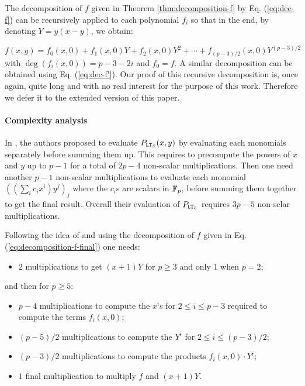 The decomposition of $f$ given in Theorem \ref{thm:decomposition-f} by Eq. (\ref{eq:dec-f}) can be recursively applied to each polynomial $f_i$ so that in the end, by denoting $Y=y(x-y)$, we obtain:

\begin{equation}
  \label{eq:decomposition-f-final}
  f(x,y) = f_0(x,0) + f_1(x,0)Y + f_2(x,0)Y^2 + \cdots + f_{(p-3)/2}(x,0)Y^{(p-3)/2}
\end{equation}
with $\deg (f_{i}(x,0)) = p-3 - 2i$ and $f_0 = f$. A similar decomposition can be obtained using Eq. (\ref{eq:dec-f'}). Our proof of this recursive decomposition is, once again, quite long and with no real interest for the purpose of this work. Therefore we defer it to the extended version of this paper.\newline

\paragraph{Complexity analysis}
In \cite{TLWRK20}, the authors proposed to evaluate $P_{\mathtt{LT}_S}(x,y)$ by evaluating each monomials separately before summing them up. This requires to precompute the powers of $x$ and $y$ up to $p-1$ for a total of $2p-4$ non-scalar multiplications. Then one need another $p-1$ non-scalar multiplications to evaluate each monomial $((\sum_i c_i x^i)y^j)_{j}$ where the $c_i$s are scalars in $\mathbb{F}_p$, before summing them together to get the final result. Overall their evaluation of $P_{\mathtt{LT}_{\mathcal{S}}}$ requires $3p-5$ non-sclar multiplications. \newline

Following the idea of \cite{TLWRK20} and using the decomposition of $f$ given in Eq. (\ref{eq:decomposition-f-final}) one needs:
\begin{itemize}
\item $2$ multiplications to get $(x+1)Y$ for $p\geq 3$ and only $1$ when $p=2$;
\end{itemize}
and then for $p\geq 5$:
\begin{itemize}
\item $p-4$ multiplications to compute the $x^i$s for $2\leq i \leq p-3$ required to compute the terms $f_i(x,0)$;
\item $(p-5)/2$ multiplications to compute the $Y^i$ for $2\leq i \leq (p-3)/2$;
\item $(p-3)/2$ multiplications to compute the products $f_i(x,0)\cdot Y^i$;
\item $1$ final multiplication to multiply $f$ and $(x+1)Y$.
\end{itemize}

